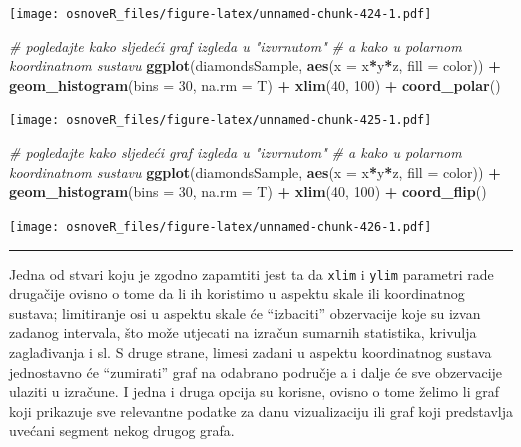 \documentclass[]{book}
\newenvironment{Shaded}{\begin{snugshade}}{\end{snugshade}}
\newcommand{\KeywordTok}[1]{\textcolor[rgb]{0.13,0.29,0.53}{\textbf{#1}}}
\newcommand{\DataTypeTok}[1]{\textcolor[rgb]{0.13,0.29,0.53}{#1}}
\newcommand{\DecValTok}[1]{\textcolor[rgb]{0.00,0.00,0.81}{#1}}
\newcommand{\StringTok}[1]{\textcolor[rgb]{0.31,0.60,0.02}{#1}}
\newcommand{\CommentTok}[1]{\textcolor[rgb]{0.56,0.35,0.01}{\textit{#1}}}
\newcommand{\OperatorTok}[1]{\textcolor[rgb]{0.81,0.36,0.00}{\textbf{#1}}}
\newcommand{\NormalTok}[1]{#1}
\theoremstyle{definition}
\theoremstyle{definition}
\theoremstyle{definition}
\theoremstyle{remark}
\begin{document}
\texttt{[image: osnoveR\_files/figure-latex/unnamed-chunk-424-1.pdf]}

\begin{Shaded}
\begin{Highlighting}[]
\CommentTok{# pogledajte kako sljedeći graf izgleda u "izvrnutom" }
\CommentTok{# a kako u polarnom koordinatnom sustavu}
\KeywordTok{ggplot}\NormalTok{(diamondsSample, }\KeywordTok{aes}\NormalTok{(}\DataTypeTok{x =}\NormalTok{ x}\OperatorTok{*}\NormalTok{y}\OperatorTok{*}\NormalTok{z, }\DataTypeTok{fill =}\NormalTok{ color)) }\OperatorTok{+}\StringTok{ }
\StringTok{  }\KeywordTok{geom_histogram}\NormalTok{(}\DataTypeTok{bins =} \DecValTok{30}\NormalTok{, }\DataTypeTok{na.rm =}\NormalTok{ T) }\OperatorTok{+}\StringTok{ }
\StringTok{  }\KeywordTok{xlim}\NormalTok{(}\DecValTok{40}\NormalTok{, }\DecValTok{100}\NormalTok{) }\OperatorTok{+}\StringTok{ }\KeywordTok{coord_polar}\NormalTok{()}
\end{Highlighting}
\end{Shaded}

\texttt{[image: osnoveR\_files/figure-latex/unnamed-chunk-425-1.pdf]}

\begin{Shaded}
\begin{Highlighting}[]
\CommentTok{# pogledajte kako sljedeći graf izgleda u "izvrnutom" }
\CommentTok{# a kako u polarnom koordinatnom sustavu}
\KeywordTok{ggplot}\NormalTok{(diamondsSample, }\KeywordTok{aes}\NormalTok{(}\DataTypeTok{x =}\NormalTok{ x}\OperatorTok{*}\NormalTok{y}\OperatorTok{*}\NormalTok{z, }\DataTypeTok{fill =}\NormalTok{ color)) }\OperatorTok{+}\StringTok{ }
\StringTok{  }\KeywordTok{geom_histogram}\NormalTok{(}\DataTypeTok{bins =} \DecValTok{30}\NormalTok{, }\DataTypeTok{na.rm =}\NormalTok{ T) }\OperatorTok{+}\StringTok{ }
\StringTok{  }\KeywordTok{xlim}\NormalTok{(}\DecValTok{40}\NormalTok{, }\DecValTok{100}\NormalTok{) }\OperatorTok{+}\StringTok{ }\KeywordTok{coord_flip}\NormalTok{() }
\end{Highlighting}
\end{Shaded}

\texttt{[image: osnoveR\_files/figure-latex/unnamed-chunk-426-1.pdf]}

\begin{center}\rule{0.5\linewidth}{\linethickness}\end{center}

Jedna od stvari koju je zgodno zapamtiti jest ta da \texttt{xlim} i
\texttt{ylim} parametri rade drugačije ovisno o tome da li ih koristimo
u aspektu skale ili koordinatnog sustava; limitiranje osi u aspektu
skale će ``izbaciti'' obzervacije koje su izvan zadanog intervala, što
može utjecati na izračun sumarnih statistika, krivulja zaglađivanja i
sl. S druge strane, limesi zadani u aspektu koordinatnog sustava
jednostavno će ``zumirati'' graf na odabrano područje a i dalje će sve
obzervacije ulaziti u izračune. I jedna i druga opcija su korisne,
ovisno o tome želimo li graf koji prikazuje sve relevantne podatke za
danu vizualizaciju ili graf koji predstavlja uvećani segment nekog
drugog grafa.
\end{document}
